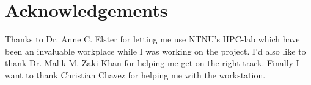 \section*{Acknowledgements}

Thanks to Dr. Anne C. Elster for letting me use NTNU's HPC-lab which have been an 
invaluable workplace while I was working on the project. I'd also like to thank
Dr. Malik M. Zaki Khan for helping me get on the right track. Finally I want to
thank Christian Chavez for helping me with the workstation.